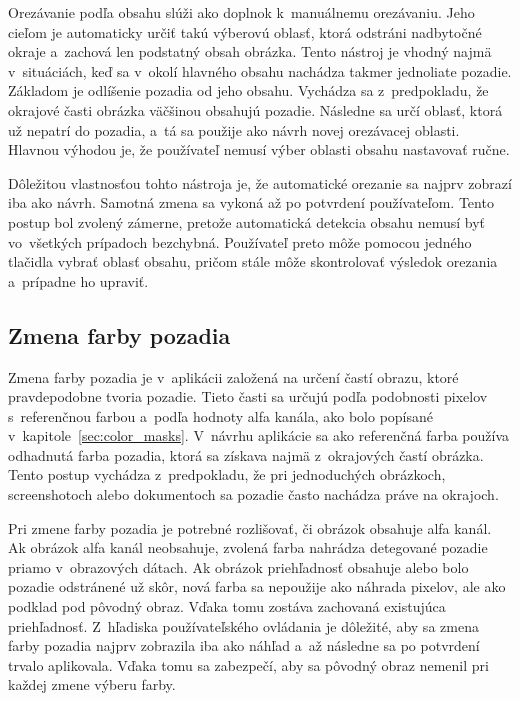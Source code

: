 Orezávanie podľa obsahu slúži ako doplnok k~manuálnemu orezávaniu. Jeho cieľom je automaticky určiť takú výberovú oblasť, ktorá odstráni nadbytočné okraje a~zachová len podstatný obsah obrázka. Tento nástroj je vhodný najmä v~situáciách, keď sa v~okolí hlavného obsahu nachádza takmer jednoliate pozadie. Základom je odlíšenie pozadia od jeho obsahu. Vychádza sa z~predpokladu, že okrajové časti obrázka väčšinou obsahujú pozadie. Následne sa určí oblasť, ktorá už nepatrí do pozadia, a~tá sa použije ako návrh novej orezávacej oblasti. Hlavnou výhodou je, že používateľ nemusí výber oblasti obsahu nastavovať ručne.

Dôležitou vlastnosťou tohto nástroja je, že automatické orezanie sa najprv zobrazí iba ako návrh. Samotná zmena sa vykoná až po potvrdení používateľom. Tento postup bol zvolený zámerne, pretože automatická detekcia obsahu nemusí byť vo~všetkých prípadoch bezchybná. Používateľ preto môže pomocou jedného tlačidla vybrať oblasť obsahu, pričom stále môže skontrolovať výsledok orezania a~prípadne ho upraviť.

\subsection{Zmena farby pozadia}

Zmena farby pozadia je v~aplikácii založená na určení častí obrazu, ktoré pravdepodobne tvoria pozadie. Tieto časti sa určujú podľa podobnosti pixelov s~referenčnou farbou a~podľa hodnoty alfa kanála, ako bolo popísané v~kapitole~\ref{sec:color_masks}. V~návrhu aplikácie sa ako referenčná farba používa odhadnutá farba pozadia, ktorá sa získava najmä z~okrajových častí obrázka. Tento postup vychádza z~predpokladu, že pri jednoduchých obrázkoch, screenshotoch alebo dokumentoch sa pozadie často nachádza práve na okrajoch.

Pri zmene farby pozadia je potrebné rozlišovať, či obrázok obsahuje alfa kanál. Ak obrázok alfa kanál neobsahuje, zvolená farba nahrádza detegované pozadie priamo v~obrazových dátach. Ak obrázok priehľadnosť obsahuje alebo bolo pozadie odstránené už skôr, nová farba sa nepoužije ako náhrada pixelov, ale ako podklad pod pôvodný obraz. Vďaka tomu zostáva zachovaná existujúca priehľadnosť. Z~hľadiska používateľského ovládania je dôležité, aby sa zmena farby pozadia najprv zobrazila iba ako náhľad a~až následne sa po potvrdení trvalo aplikovala. Vďaka tomu sa zabezpečí, aby sa pôvodný obraz nemenil pri každej zmene výberu farby.

